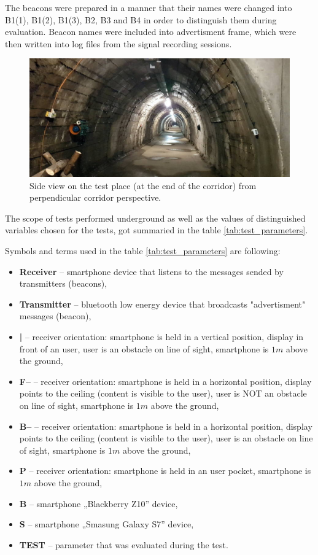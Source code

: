 \documentclass[../main.tex]{subfiles}
\begin{document}
The beacons were prepared in a manner that their names were changed into B1(1), B1(2), B1(3), B2, B3 and B4 in order to distinguish them during evaluation. Beacon names were included into advertisment frame, which were then written into log files from the signal recording sessions.

\begin{figure}[!htbp]
\includegraphics[width=\textwidth, keepaspectratio]{pictures/tests_corridor_general.pdf}
\centering
\caption{Side view on the test place (at the end of the corridor) from perpendicular corridor perspective.}
\label{fig:tests_corridor_genera}
\end{figure}


The scope of tests performed underground as well as the values of distinguished variables chosen for the tests, got summaried in the table \ref{tab:test_parameters}.

Symbols and terms used in the table \ref{tab:test_parameters} are following:
\begin{itemize}
	\item \textbf{Receiver} -- smartphone device that listens to the messages sended by transmitters (beacons),
	\item \textbf{Transmitter} -- bluetooth low energy device that broadcasts "advertisment" messages (beacon),
	\item \textbf{|} -- receiver orientation: smartphone is held in a vertical position, display in front of an user, user is an obstacle on line of sight, smartphone is $1m$ above the ground,
	\item \textbf{F--} --	receiver orientation: smartphone is held in a horizontal position, display points to the ceiling (content is visible to the user), user is NOT an obstacle on line of sight, smartphone is $1m$ above the ground,
	\item \textbf{B--} --	receiver orientation: smartphone is held in a horizontal position, display points to the ceiling (content is visible to the user), user is an obstacle on line of sight, smartphone is $1m$ above the ground,
	\item \textbf{P}	-- receiver orientation: smartphone is held in an user pocket, smartphone is $1m$ above the ground,
	\item \textbf{B}	-- smartphone „Blackberry Z10” device,
	\item \textbf{S}	-- smartphone „Smasung Galaxy S7” device,
	\item \textbf{TEST} -- parameter that was evaluated during the test.
\end{itemize}
\end{document}
